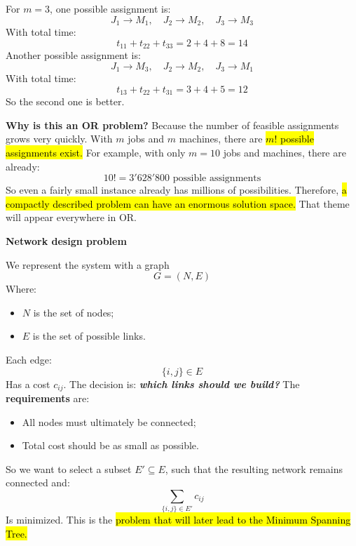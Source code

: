 \highspace
\begin{examplebox}[: $m=3$]
    For $m=3$, one possible assignment is:
    \begin{equation*}
        J_1 \to M_1, \quad J_2 \to M_2, \quad J_3 \to M_3
    \end{equation*}
    With total time:
    \begin{equation*}
        t_{11} + t_{22} + t_{33} = 2 + 4 + 8 = 14
    \end{equation*}
    Another possible assignment is:
    \begin{equation*}
        J_1 \to M_3, \quad J_2 \to M_2, \quad J_3 \to M_1
    \end{equation*}
    With total time:
    \begin{equation*}
        t_{13} + t_{22} + t_{31} = 3 + 4 + 5 = 12
    \end{equation*}
    So the second one is better.
\end{examplebox}

\highspace
\textcolor{Red2}{ \textbf{Why is this an OR problem?}} Because the number of feasible assignments grows very quickly. With $m$ jobs and $m$ machines, there are \hl{$m!$ possible assignments exist.} For example, with only $m=10$ jobs and machines, there are already:
\begin{equation*}
    10! = 3'628'800 \text{ possible assignments}
\end{equation*}
So even a fairly small instance already has millions of possibilities. Therefore, \hl{a compactly described problem can have an enormous solution space.} That theme will appear everywhere in OR.

\highspace
\begin{flushleft}
    \textcolor{Red2}{ \textbf{Network design problem}}
\end{flushleft}
We represent the system with a graph
\begin{equation*}
    G=(N,E)
\end{equation*}
Where:
\begin{itemize}
    \item $N$ is the set of nodes;
    \item $E$ is the set of possible links.
\end{itemize}
Each edge:
\begin{equation*}
    \{i,j\}\in E
\end{equation*}
Has a cost $c_{ij}$. The decision is: \emph{\textbf{which links should we build?}} The \textbf{requirements} are:
\begin{itemize}
    \item All nodes must ultimately be connected;
    \item Total cost should be as small as possible.
\end{itemize}
So we want to select a subset $E'\subseteq E$, such that the resulting network remains connected and:
\begin{equation*}
    \sum_{\{i,j\}\in E'} c_{ij}
\end{equation*}
Is minimized. This is the \hl{problem that will later lead to the Minimum Spanning Tree.}

